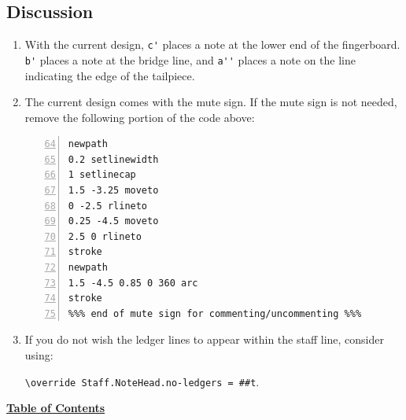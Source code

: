 \subsection{Discussion}
\begin{enumerate}
\item With the current design, \verb|c'| places a note at the lower end of the fingerboard. \verb|b'| places a note at the bridge line, and \verb|a''| places a note on the line indicating the edge of the tailpiece. 

\item The current design comes with the mute sign. If the mute sign is not needed, remove the following portion of the code above:

\begin{Verbatim}[numbers=left,xleftmargin=5mm,firstnumber=64]
%%% mute sign; commentify if not needed %%%
newpath
0.2 setlinewidth
1 setlinecap
1.5 -3.25 moveto
0 -2.5 rlineto
0.25 -4.5 moveto
2.5 0 rlineto
stroke
newpath
1.5 -4.5 0.85 0 360 arc
stroke
%%% end of mute sign for commenting/uncommenting %%%
\end{Verbatim}

\item If you do not wish the ledger lines to appear within the staff line, consider using: \par
 \verb|\override Staff.NoteHead.no-ledgers = ##t|.
\end{enumerate}

\hyperref[sec:toc]{\textbf{Table of Contents}}

\vfill \break


